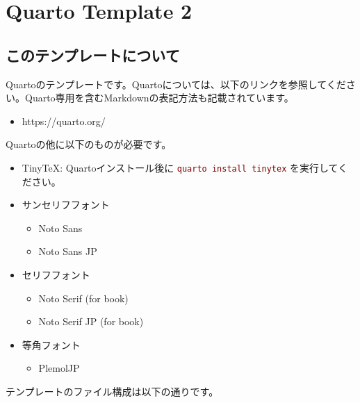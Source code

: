 \documentclass[
  japanese,
  letterpaper,
  lualatex,
  ja=standard,
  10pt,
  a4paper,
  textwidth-limit=50,
  openany]{bxjsbook}
\providecommand{\tightlist}{%
  \setlength{\itemsep}{0pt}\setlength{\parskip}{0pt}}
\let\oldtexttt\texttt
\renewcommand{\texttt}[1]{  %
  \colorbox{codebg}{  %
    \textcolor{Maroon}{  %
      \small  %
      \oldtexttt{#1}
    }
  }
}
\begin{document}

\chapter{Quarto Template 2}\label{quarto-template-2}

\section{このテンプレートについて}\label{ux3053ux306eux30c6ux30f3ux30d7ux30ecux30fcux30c8ux306bux3064ux3044ux3066-1}

Quartoのテンプレートです。Quartoについては、以下のリンクを参照してください。Quarto専用を含むMarkdownの表記方法も記載されています。

\begin{itemize}
\tightlist
\item
  https://quarto.org/
\end{itemize}

Quartoの他に以下のものが必要です。

\begin{itemize}
\tightlist
\item
  TinyTeX:
  Quartoインストール後に\texttt{quarto\ install\ tinytex}を実行してください。
\item
  サンセリフフォント

  \begin{itemize}
  \tightlist
  \item
    Noto Sans
  \item
    Noto Sans JP
  \end{itemize}
\item
  セリフフォント

  \begin{itemize}
  \tightlist
  \item
    Noto Serif (for book)
  \item
    Noto Serif JP (for book)
  \end{itemize}
\item
  等角フォント

  \begin{itemize}
  \tightlist
  \item
    PlemolJP
  \end{itemize}
\end{itemize}

テンプレートのファイル構成は以下の通りです。
\end{document}
